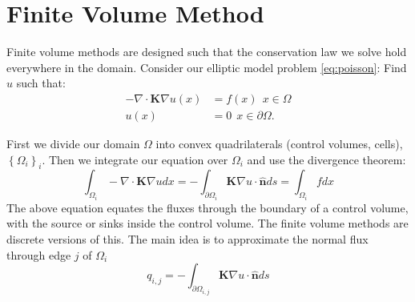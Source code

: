 \documentclass[../Main/main.tex]{subfiles}
\begin{document}
	\section*{Finite Volume Method}

		Finite volume methods are designed such that the conservation law we solve hold everywhere in the domain. Consider our elliptic model problem \eqref{eq:poisson}:
		Find $u$ such that:
		\begin{equation} 
			\begin{split}
				-\nabla \cdot \bm{K} \nabla u(x) &= f(x) \ \  x\in \Omega \\ 
				u(x) &= 0 \ \ x\in \partial \Omega.
			\end{split}
		\end{equation}
		
		 First we divide our domain $\Omega$ into convex quadrilaterals (control volumes, cells), $\left \{ \Omega_i \right \}_i$. Then we integrate our equation over $\Omega_i$ and use the divergence theorem:
	\begin{equation}\label{eq:fvm1}
		\int_{\Omega_i} -\nabla \cdot \bm{K} \nabla u dx = -\int_{\partial \Omega_i} \bm{K}\nabla u \cdot \bm{\hat{n}} ds = \int_{\Omega_i}fdx
	\end{equation}
	The above equation equates the fluxes through the boundary of a control volume, with the source or sinks inside the control volume. The finite volume methods are discrete versions of this. The main idea is to approximate the normal flux through edge $j$ of $\Omega_i$
	\begin{equation}
		q_{i,j} =-\int_{\partial \Omega_{i,j}} \bm{K}\nabla u \cdot \bm{\hat{n}} ds
	\end{equation}
	
\end{document}
